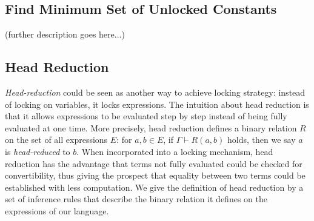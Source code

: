 \subsection{Find Minimum Set of Unlocked Constants}
(further description goes here...)

\subsection{Head Reduction}\label{theory:head-red}
\emph{Head-reduction} could be seen as another way to achieve locking strategy: instead of locking on variables, it locks expressions. The intuition about head reduction is that it allows expressions to be evaluated step by step instead of being fully evaluated at one time. More precisely, head reduction defines a binary relation $R$ on the set of all expressions $E$: for $a, b \in E$, if $\Gamma \vdash R(a, b)$ holds, then we say $a$ is \emph{head-reduced} to $b$. When incorporated into a locking mechanism, head reduction has the advantage that terms not fully evaluated could be checked for convertibility, thus giving the prospect that equality between two terms could be established with less computation. We give the definition of head reduction by a set of inference rules that describe the binary relation it defines on the expressions of our language. 

